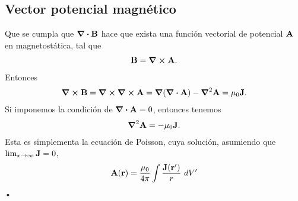 \subsection{Vector potencial magnético}
Que se cumpla que $\div{\vb{B}}$ hace que exista una función 
vectorial de potencial $\vb{A}$ en magnetostática, tal que 
\begin{align}
\vb{B}=\curl{\vb{A}}.
\end{align}
Entonces
\begin{align}
\curl{\vb{B}}=\curl{\curl{\vb{A}}}=\grad{\qty(\div{\vb{A}})}
-\grad^2\vb{A}=\mu_0\vb{J}.
\end{align}
Si imponemos la condición de $\div{\vb{A}}=0$, entonces tenemos 
\begin{align}
\grad^2\vb{A}=-\mu_0\vb{J}.
\label{•}
\end{align}
Esta es simplementa la ecuación de Poisson, cuya solución, 
asumiendo que $\lim_{x\to\infty}\vb{J}=0$,
\begin{align}
\vb{A}(\vb{r})=\frac{\mu_0}{4\pi}\int \frac{\vb{J}(\vb{r}')}{r}\ dV'
\label{}
\end{align}
•
